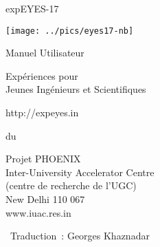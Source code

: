 \documentclass[12pt,a4paper]{report}
\begin{document}
\begin{titlepage}
\thispagestyle{empty}

\vspace{0.2in}

\begin{center}
{\Huge{}expEYES-17}
\par\end{center}{\Huge \par}

\begin{center}
\texttt{[image: ../pics/eyes17-nb]}
\par\end{center}

\begin{center}
{\large{}Manuel Utilisateur }
\par\end{center}{\large \par}

\begin{center}
{\LARGE{}Expériences pour}\\
{\LARGE{} Jeunes Ingénieurs et Scientifiques}
\par\end{center}{\LARGE \par}

\begin{center}
http://expeyes.in
\par\end{center}

\begin{center}
du
\par\end{center}

\begin{center}
Projet PHOENIX\\
Inter-University Accelerator Centre \\
(centre de recherche de l'UGC)\\
New Delhi 110 067\\
www.iuac.res.in
\par\end{center}

\vfill

{~\hfill \small Traduction : Georges Khaznadar}

\end{titlepage}
\end{document}

